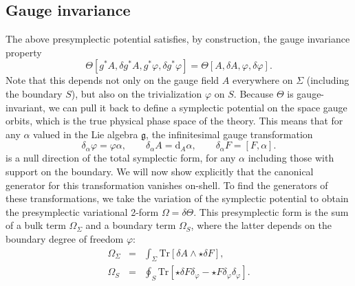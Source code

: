 \documentclass[a4paper,11pt]{article}
\newcommand{\be}{\begin{equation}}
\newcommand{\ee}{\end{equation}}
\newcommand{\bea}{\begin{eqnarray}}
\newcommand{\eea}{\end{eqnarray}}
\def\rd{\mathrm{d}}
\newcommand{\Tr}{\mbox{Tr}}
\begin{document}
\subsection{Gauge invariance} 
The above presymplectic potential satisfies, by construction, the gauge invariance property
\be
\Theta[g^* A, \delta g^*A, g^*\varphi, \delta g^* \varphi] = \Theta[A, \delta A, \varphi, \delta \varphi]\label{gaugeinv}.
\ee
Note that this depends not only on the gauge field $A$ everywhere on $\Sigma$ (including the boundary $S$), but also on the trivialization $\varphi$ on $S$.
Because $\Theta$ is gauge-invariant, we can pull it back to define a symplectic potential on the space gauge orbits, which is the true physical phase space of the theory.
This means that for any $\alpha$ valued in the Lie algebra $\mathfrak{g}$, the infinitesimal gauge transformation
\be \label{gaugetrans}
\delta_\alpha \varphi = \varphi \alpha, \qquad
\delta_\alpha A = \rd_A \alpha,
\qquad \delta_\alpha F = [F,\alpha].
\ee 
is a null direction of the total symplectic form, for any $\alpha$ including those with support on the boundary.
We will now show explicitly that the canonical generator for this transformation vanishes on-shell. 
To find the generators of these transformations, we take the variation of the symplectic potential to obtain  the presymplectic variational 2-form $\Omega =\delta \Theta$.
This presymplectic form is the sum of a bulk term $\Omega_\Sigma$ and a boundary term $\Omega_S$, where the latter depends on the boundary degree of freedom $\varphi$:
\bea
\Omega_\Sigma &=&  \int_\Sigma \Tr[ \delta A\wedge \star \delta F ], \\
\Omega_S &=&  \oint_S \Tr[\star \delta F \delta_\varphi - \star F \delta_\varphi \delta_\varphi].
\eea
\end{document}
